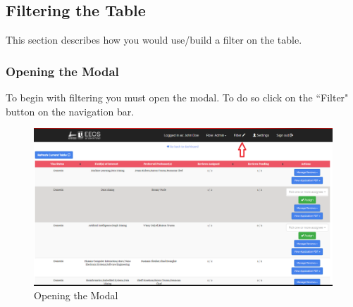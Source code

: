 \documentclass[fontsize=12pt,paper=letter,twoside]{scrartcl}
\begin{document}
\clearpage
\subsection{Filtering the Table}
This section describes how you would use/build a filter on the table.

\subsubsection{Opening the Modal}
To begin with filtering you must open the modal. To do so click on the ``Filter" button on the navigation bar.

\begin{figure}[!htb]
\begin{center}
\includegraphics[width=.99\textwidth]{images/mr/open_modal.png}
\end{center}
\caption{Opening the  Modal}
\label{fig:open_modal}
\end{figure}

\clearpage
\newpage
\end{document}

